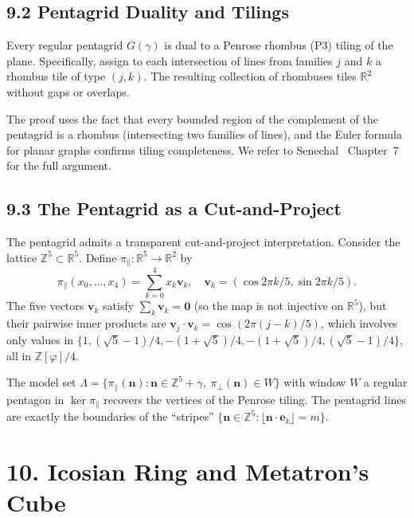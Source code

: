 \subsection{9.2 Pentagrid Duality and Tilings}
\label{sec:pentagrid-duality}

\begin{theorem}
\label{thm:debruijn-duality}
Every regular pentagrid \(G(\gamma)\) is dual to
a Penrose rhombus (P3) tiling of the plane.
Specifically, assign to each intersection of
lines from families \(j\) and \(k\) a rhombus tile
of type \((j,k)\). The resulting collection of
rhombuses tiles \(\mathbb{R}^2\) without gaps or
overlaps.
\end{theorem}

The proof uses the fact that every bounded region
of the complement of the pentagrid is a rhombus
(intersecting two families of lines), and the
Euler formula for planar graphs confirms tiling
completeness. We refer to
Senechal~\cite{senechal_quasicrystals} Chapter~7
for the full argument.

\subsection{9.3 The Pentagrid as a
Cut-and-Project}\label{sec:pentagrid-cut}

The pentagrid admits a transparent cut-and-project
interpretation. Consider the lattice
\(\mathbb{Z}^5 \subset \mathbb{R}^5\). Define
\(\pi_\parallel : \mathbb{R}^5 \to \mathbb{R}^2\)
by
\[
  \pi_\parallel(x_0, \ldots, x_4) =
    \sum_{k=0}^{4} x_k \mathbf{v}_k,
  \quad
  \mathbf{v}_k = (\cos 2\pi k/5, \sin 2\pi k/5).
\]
The five vectors \(\mathbf{v}_k\) satisfy
\(\sum_k \mathbf{v}_k = \mathbf{0}\) (so the
map is not injective on \(\mathbb{R}^5\)), but
their pairwise inner products are
\(\mathbf{v}_j \cdot \mathbf{v}_k = \cos(2\pi(j-k)/5)\),
which involves only values in
\(\{1, (\sqrt{5}-1)/4, -(1+\sqrt{5})/4, -(1+\sqrt{5})/4, (\sqrt{5}-1)/4\}\),
all in \(\mathbb{Z}[\varphi]/4\).

The model set
\(\Lambda = \{\pi_\parallel(\mathbf{n}) : \mathbf{n}
\in \mathbb{Z}^5 + \gamma,\; \pi_\perp(\mathbf{n})
\in W\}\)
with window \(W\) a regular pentagon in
\(\ker \pi_\parallel\) recovers the vertices of the
Penrose tiling. The pentagrid lines are exactly the
boundaries of the ``stripes''
\(\{\mathbf{n} \in \mathbb{Z}^5 :
\lfloor\mathbf{n} \cdot \mathbf{e}_k\rfloor = m\}\).

\section{10. Icosian Ring and Metatron's
Cube}\label{sec:icosian}

